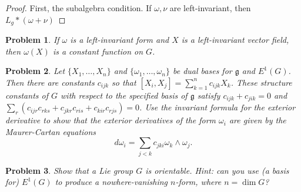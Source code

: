 \documentclass{article}
\newtheorem{plm}{Problem}
\begin{document}
\begin{proof}
  First, the subalgebra condition.
  If $\omega, \nu$ are left-invariant, then $L_{g}*(\omega + \nu)$
\end{proof}

\begin{plm}
  If $\omega$ is a left-invariant form and $X$ is a left-invariant vector field, then $\omega(X)$ is a constant function on $G$.
\end{plm}

\begin{plm}
  Let $\{X_{1}, \ldots, X_{n}\}$ and $\{\omega_{1}, \ldots, \omega_{n}\}$ be dual bases for $\mathfrak{g}$ and $E^{1}(G)$.
  Then there are constants $c_{ijk}$ so that $[X_{i}, X_{j}] = \sum_{k = 1}^{n}c_{ijk}X_{k}$.
  These \textit{structure constants} of $G$ with respect to the specified basis of $\mathfrak{g}$ satisfy $c_{ijk} + c_{jik} = 0$
  and $\sum_{r}(c_{ijr}c_{rks} + c_{jkr}c_{ris} + c_{kir}c_{rjs}) = 0$.
  Use the invariant formula for the exterior derivative to show that the exterior derivatives of the form $\omega_{i}$
  are given by the \textit{Maurer-Cartan} equations
  \[
    d\omega_{i} = \sum_{j < k}c_{jki}\omega_{k} \wedge \omega_{j}.
  \]
\end{plm}

\begin{plm}
  Show that a Lie group $G$ is orientable. Hint: can you use (a basis for) $E^{1}(G)$ to produce a nowhere-vanishing $n$-form,
  where $n = \dim G$?
\end{plm}
\end{document}
